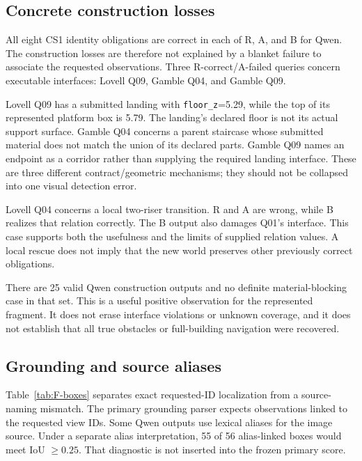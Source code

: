 \subsection{Concrete construction losses}
All eight CS1 identity obligations are correct in each of R, A, and B for Qwen. The construction losses are therefore not explained by a blanket failure to associate the requested observations. Three R-correct/A-failed queries concern executable interfaces: Lovell Q09, Gamble Q04, and Gamble Q09.

Lovell Q09 has a submitted landing with \texttt{floor\_z}=5.29, while the top of its represented platform box is 5.79. The landing's declared floor is not its actual support surface. Gamble Q04 concerns a parent staircase whose submitted material does not match the union of its declared parts. Gamble Q09 names an endpoint as a corridor rather than supplying the required landing interface. These are three different contract/geometric mechanisms; they should not be collapsed into one visual detection error.

Lovell Q04 concerns a local two-riser transition. R and A are wrong, while B realizes that relation correctly. The B output also damages Q01's interface. This case supports both the usefulness and the limits of supplied relation values. A local rescue does not imply that the new world preserves other previously correct obligations.

There are 25 valid Qwen construction outputs and no definite material-blocking case in that set. This is a useful positive observation for the represented fragment. It does not erase interface violations or unknown coverage, and it does not establish that all true obstacles or full-building navigation were recovered.

\subsection{Grounding and source aliases}
Table~\ref{tab:F-boxes} separates exact requested-ID localization from a source-naming mismatch. The primary grounding parser expects observations linked to the requested view IDs. Some Qwen outputs use lexical aliases for the image source. Under a separate alias interpretation, 55 of 56 alias-linked boxes would meet IoU $\geq0.25$. That diagnostic is not inserted into the frozen primary score.

\begin{table}[htbp]\centering\small

\caption{Qwen given-point localization records: exact-ID pass, low IoU, source alias, no box, or failed allocation. Aliases are inspected separately instead of being silently rewritten into a pass.}\label{tab:F-boxes}
\end{table}

